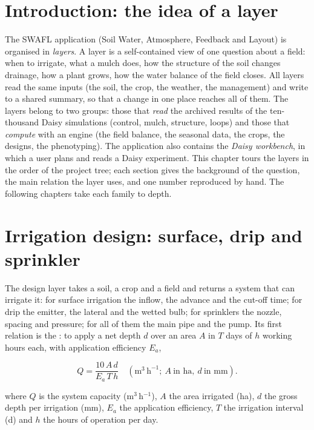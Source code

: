 \section{Introduction: the idea of a layer}
The SWAFL application (Soil Water, Atmosphere, Feedback and Layout) is organised in \emph{layers}. A layer is a self-contained view of one question about a field: when to irrigate, what a mulch does, how the structure of the soil changes drainage, how a plant grows, how the water balance of the field closes. All layers read the same inputs (the soil, the crop, the weather, the management) and write to a shared summary, so that a change in one place reaches all of them. The layers belong to two groups: those that \emph{read} the archived results of the ten-thousand Daisy simulations (control, mulch, structure, loops) and those that \emph{compute} with an engine (the field balance, the seasonal data, the crops, the designs, the phenotyping). The application also contains the \emph{Daisy workbench}, in which a user plans and reads a Daisy experiment. This chapter tours the layers in the order of the project tree; each section gives the background of the question, the main relation the layer uses, and one number reproduced by hand. The following chapters take each family to depth.

\section{Irrigation design: surface, drip and sprinkler}
The design layer takes a soil, a crop and a field and returns a system that can irrigate it: for surface irrigation the inflow, the advance and the cut-off time; for drip the emitter, the lateral and the wetted bulb; for sprinklers the nozzle, spacing and pressure; for all of them the main pipe and the pump. Its first relation is the : to apply a net depth $d$ over an area $A$ in $T$ days of $h$ working hours each, with application efficiency $E_a$,

\begin{equation}Q=\frac{10\,A\,d}{E_a\,T\,h}\quad(\mathrm{m^3\,h^{-1}};\ A\ \text{in ha},\ d\ \text{in mm}).\label{eq:cap7}\end{equation}
\par\noindent where $Q$ is the system capacity (m$^3$\,h$^{-1}$), $A$ the area irrigated (ha), $d$ the gross depth per irrigation (mm), $E_a$ the application efficiency, $T$ the irrigation interval (d) and $h$ the hours of operation per day.



